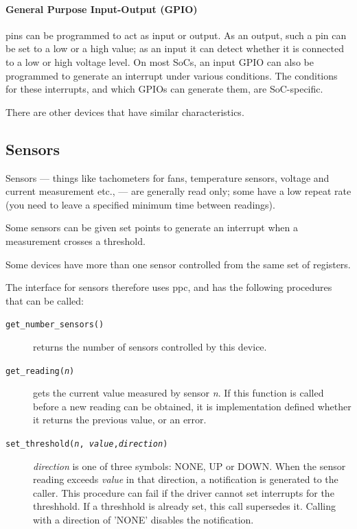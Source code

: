 \documentclass[a4paper,12pt]{report}
\begin{document}
\paragraph{General Purpose Input-Output (GPIO)} pins can be
programmed to act as input or output.  As an output, such a pin can be
set to a low or a high value; as an input it can detect whether it is
connected to a low or high voltage level.  On most SoCs, an input GPIO
can also be programmed to generate an interrupt under various
conditions. The conditions for these interrupts, and which
GPIOs can generate them, are SoC-specific.

There are other devices that have similar characteristics.

\subsection{Sensors}
Sensors --- things like tachometers for fans, temperature sensors,
voltage and current measurement etc., --- are generally read only;
some have a low repeat rate (you need to leave a specified minimum
time between readings).

Some sensors can be given set points to generate an interrupt when a
measurement crosses a threshold.

Some devices have more than one sensor controlled from the same set of
registers.

The interface for sensors therefore uses \gls{ppc}, and has the following
procedures that can be called:
\begin{description}
  \item[\texttt{get\_number\_sensors()}] returns the number of sensors
    controlled by this device.
  \item[\texttt{get\_reading(\emph{n})}] gets the current value
    measured by sensor \emph{n}.  If this function is called before a new
      reading can be obtained, it is implementation defined whether
      it returns the previous value, or an error.
  \item[\texttt{set\_threshold(\emph{n}, \emph{value},\emph{direction})}]
    \emph{direction} is one of three symbols: NONE, UP or DOWN.  When the
    sensor reading exceeds \emph{value} in that direction, a
    notification is generated to the caller.
    This procedure can fail if the driver cannot set interrupts for
    the threshhold.  If a threshhold is already set, this call
    supersedes it.  Calling with a direction of 'NONE' disables the
    notification.
\end{description}
\end{document}
